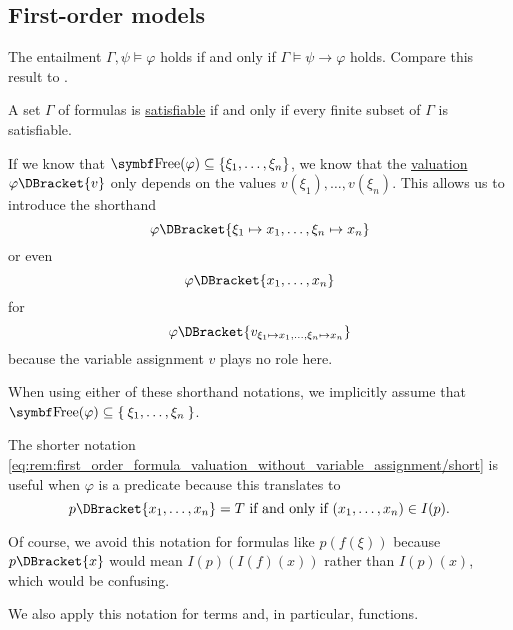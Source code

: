 \subsection{First-order models}\label{subsec:first_order_models}

\begin{theorem}\label{thm:semantic_deduction_theorem}
  The entailment \( \Gamma, \psi \vDash \varphi \) holds if and only if \( \Gamma \vDash \psi \rightarrow \varphi \) holds. Compare this result to .
\end{theorem}

\begin{theorem}\label{thm:first_order_compactness_theorem}
  A set \( \Gamma \) of formulas is \hyperref[def:propositional_semantics/satisfiability]{satisfiable} if and only if every finite subset of \( \Gamma \) is satisfiable.
\end{theorem}

\begin{remark}\label{rem:first_order_formula_valuation_without_variable_assignment}
  If we know that \( \Bold{Free}(\varphi) \subseteq \{ \xi_1, \ldots, \xi_n \} \), we know that the \hyperref[def:first_order_valuation/formula_valuation]{valuation} \( \varphi\DBracket{v} \) only depends on the values \( v(\xi_1), \ldots, v(\xi_n) \). This allows us to introduce the shorthand
  \begin{equation}\label{eq:rem:first_order_formula_valuation_without_variable_assignment/long}
    \varphi\DBracket{\xi_1 \mapsto x_1, \ldots, \xi_n \mapsto x_n}
  \end{equation}
  or even
  \begin{equation}\label{eq:rem:first_order_formula_valuation_without_variable_assignment/short}
    \varphi\DBracket{x_1, \ldots, x_n}
  \end{equation}
  for
  \begin{equation*}
    \varphi\DBracket{v_{\xi_1 \mapsto x_1, \ldots, \xi_n \mapsto x_n}}
  \end{equation*}
  because the variable assignment \( v \) plays no role here.

  When using either of these shorthand notations, we implicitly assume that \( \Bold{Free}(\varphi) \subseteq \Set{ \xi_1, \ldots, \xi_n } \).

  The shorter notation \eqref{eq:rem:first_order_formula_valuation_without_variable_assignment/short} is useful when \( \varphi \) is a predicate because this translates to
  \begin{equation*}
    p\DBracket{x_1, \ldots, x_n} = T \T{if and only if} (x_1, \ldots, x_n) \in I(p).
  \end{equation*}

  Of course, we avoid this notation for formulas like \( p(f(\xi)) \) because \( p\DBracket{x} \) would mean \( I(p)(I(f)(x)) \) rather than \( I(p)(x) \), which would be confusing.

  We also apply this notation for terms and, in particular, functions.
\end{remark}

